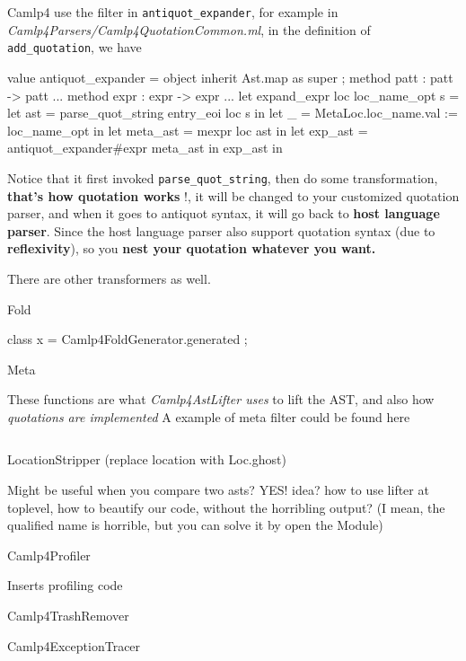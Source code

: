 Camlp4 use the filter in \verb|antiquot_expander|, for example in
\textit{Camlp4Parsers/Camlp4QuotationCommon.ml}, in the definition of
\verb|add_quotation|, we have


\begin{ocamlcode}
value antiquot_expander = object
  inherit Ast.map as super ;
  method patt : patt -> patt ...
  method expr : expr -> expr ...
let expand_expr loc loc_name_opt s =
  let ast = parse_quot_string entry_eoi loc s in
  let _ = MetaLoc.loc_name.val := loc_name_opt in
  let meta_ast = mexpr loc ast in
  let exp_ast = antiquot_expander#expr meta_ast in
  exp_ast in
\end{ocamlcode}


Notice that it first invoked \verb|parse_quot_string|, then do some
transformation, \textbf{ that's how quotation works} !, it will be
changed to your customized quotation parser, and when it goes to
antiquot syntax, it will go back to \textbf{ host language
  parser}. Since the host language parser also support quotation
syntax (due to \textbf{ reflexivity}), so you \textbf{ nest your
  quotation whatever you want.}

There are other transformers as well.


Fold

\begin{ocamlcode}
  class x = Camlp4FoldGenerator.generated ;
\end{ocamlcode}

Meta 


These functions are what \emph{Camlp4AstLifter uses} to lift the AST,
and also how \emph{quotations are implemented }
A example of meta filter could be found here 

\inputminted[fontsize=\scriptsize, lastline=40]{ocaml}{camlp4/code/jake/jso}



LocationStripper (replace location with Loc.ghost)


Might be useful when you compare two asts? YES!  idea? how to use
lifter at toplevel, how to beautify our code, without the horribling
output? (I mean, the qualified name is horrible, but you can solve it
by open the Module)


Camlp4Profiler 


Inserts profiling code


Camlp4TrashRemover 


Camlp4ExceptionTracer 


